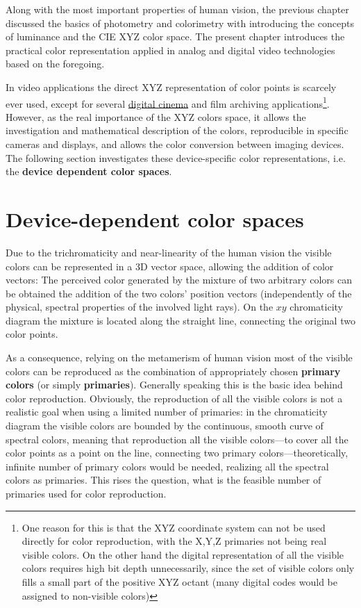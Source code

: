 Along with the most important properties of human vision, the previous chapter discussed the basics of photometry and colorimetry with introducing the concepts of luminance and the CIE XYZ color space.
The present chapter introduces the practical color representation applied in analog and digital video technologies based on the foregoing.

\vspace{3mm}
In video applications the direct XYZ representation of color points is scarcely ever used, except for several \href{https://en.wikipedia.org/wiki/Digital_Cinema_Package}{digital cinema} and film archiving applications\footnote{
One reason for this is that the XYZ coordinate system can not be used directly for color reproduction, with the X,Y,Z primaries not being real visible colors.
On the other hand the digital representation of all the visible colors requires high bit depth unnecessarily, since the set of visible colors only fills a small part of the positive XYZ octant (many digital codes would be assigned to non-visible colors)}.
However, as the real importance of the XYZ colors space, it allows the investigation and mathematical description of the colors, reproducible in specific cameras and displays, and allows the color conversion between imaging devices.
The following section investigates these device-specific color representations, i.e. the \textbf{device dependent color spaces}.

\section{Device-dependent color spaces}

Due to the trichromaticity and near-linearity of the human vision the visible colors can be represented in a 3D vector space, allowing the addition of color vectors:
The perceived color generated by the mixture of two arbitrary colors can be obtained the addition of the two colors' position vectors (independently of the physical, spectral properties of the involved light rays).
On the $xy$ chromaticity diagram the mixture is located along the straight line, connecting the original two color points.

As a consequence, relying on the metamerism of human vision most of the visible colors can be reproduced as the combination of appropriately chosen \textbf{primary colors} (or simply \textbf{primaries}).
Generally speaking this is the basic idea behind color reproduction.
Obviously, the reproduction of all the visible colors is not a realistic goal when using a limited number of primaries:
in the chromaticity diagram the visible colors are bounded by the continuous, smooth curve of spectral colors, meaning that reproduction all the visible colors---to cover all the color points as a point on the line, connecting two primary colors---theoretically, infinite number of primary colors would be needed, realizing all the spectral colors as primaries.
This rises the question, what is the feasible number of primaries used for color reproduction.


